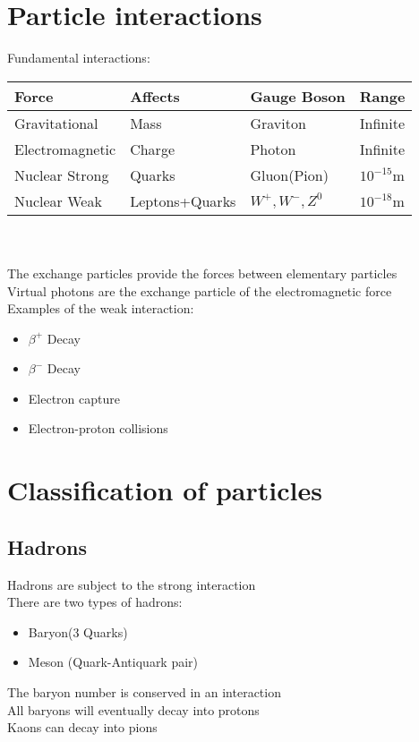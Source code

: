 \documentclass{article}[18pt]
\begin{document}
\section{Particle interactions}
Fundamental interactions:\\
{\def\arraystretch{1.5}

\begin{tabularx}{\textwidth}{|X|X|X|X|}
\hline
\textbf{Force}&\textbf{Affects}&\textbf{Gauge Boson}&\textbf{Range}\\
\hline
Gravitational&Mass&Graviton&Infinite\\
\hline
Electromagnetic&Charge&Photon&Infinite\\
\hline
Nuclear Strong&Quarks&Gluon(Pion)&$10^{-15}$m\\
\hline
Nuclear Weak&Leptons+Quarks&$W^+,W^-,Z^0$&$10^{-18}$m\\
\hline
\end{tabularx}}\\
\\
\newpage
The exchange particles provide the forces between elementary particles\\
Virtual photons are the exchange particle of the electromagnetic force\\
Examples of the weak interaction:
\begin{itemize}
\item $\beta^+$ Decay
\item $\beta^-$ Decay
\item Electron capture
\item Electron-proton collisions
\end{itemize}
\section{Classification of particles}
\subsection{Hadrons}
Hadrons are subject to the strong interaction\\
There are two types of hadrons:
\begin{itemize}
\item Baryon(3 Quarks)
\item Meson (Quark-Antiquark pair)
\end{itemize}
The baryon number is conserved in an interaction\\
All baryons will eventually decay into protons\\
Kaons can decay into pions\\
\end{document}
